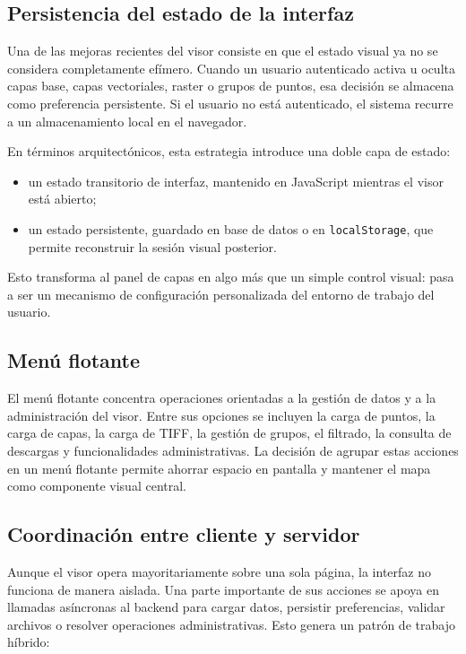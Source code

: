 \documentclass[12pt,a4paper]{report}
\begin{document}
\subsection{Persistencia del estado de la interfaz}

Una de las mejoras recientes del visor consiste en que el estado visual ya no se considera completamente ef\'imero. Cuando un usuario autenticado activa u oculta capas base, capas vectoriales, raster o grupos de puntos, esa decisi\'on se almacena como preferencia persistente. Si el usuario no est\'a autenticado, el sistema recurre a un almacenamiento local en el navegador.

En t\'erminos arquitect\'onicos, esta estrategia introduce una doble capa de estado:

\begin{itemize}
    \item un estado transitorio de interfaz, mantenido en JavaScript mientras el visor est\'a abierto;
    \item un estado persistente, guardado en base de datos o en \texttt{localStorage}, que permite reconstruir la sesi\'on visual posterior.
\end{itemize}

Esto transforma al panel de capas en algo m\'as que un simple control visual: pasa a ser un mecanismo de configuraci\'on personalizada del entorno de trabajo del usuario.

\subsection{Men\'u flotante}

El men\'u flotante concentra operaciones orientadas a la gesti\'on de datos y a la administraci\'on del visor. Entre sus opciones se incluyen la carga de puntos, la carga de capas, la carga de TIFF, la gesti\'on de grupos, el filtrado, la consulta de descargas y funcionalidades administrativas. La decisi\'on de agrupar estas acciones en un men\'u flotante permite ahorrar espacio en pantalla y mantener el mapa como componente visual central.

\subsection{Coordinaci\'on entre cliente y servidor}

Aunque el visor opera mayoritariamente sobre una sola p\'agina, la interfaz no funciona de manera aislada. Una parte importante de sus acciones se apoya en llamadas as\'incronas al backend para cargar datos, persistir preferencias, validar archivos o resolver operaciones administrativas. Esto genera un patr\'on de trabajo h\'ibrido:
\end{document}
